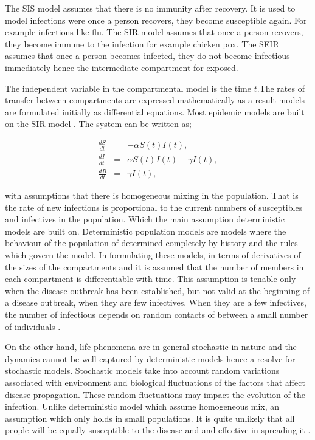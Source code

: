 The SIS model assumes that there is no immunity after recovery. It is used to model infections were once a person recovers, they become susceptible again. For example infections like flu. The SIR model assumes that once a person recovers, they become immune to the infection for example chicken pox. The SEIR assumes that once a person becomes infected, they do not become infectious immediately hence the intermediate compartment for exposed. 


The independent variable in the compartmental model is the time $t$.The rates of transfer between compartments are expressed mathematically as a result models are formulated initially as differential equations. Most epidemic models are built on the SIR model \citep{m1925applications}. The system can be written as;

\begin{center}
\begin{equation} \label{eqn1_1}
\begin{array}{ccl}
\frac{dS}{dt} &= &-\alpha S(t) I(t),\\
 \frac{dI}{dt} &=& \alpha S(t) I(t) - \gamma  I(t), \\
 \frac{dR}{dt} &= &\gamma  I(t),
\end{array}  
\end{equation}
\end{center}



with assumptions that there is homogeneous mixing in the population. That is the rate of new infections is proportional to the current numbers of susceptibles and infectives in the population. Which the main assumption deterministic models are built on. Deterministic population  models are models where the behaviour of the population of determined completely by history and the rules which govern the model. In formulating these models, in terms of derivatives of the sizes of the compartments and it is assumed that the number of members in each compartment is differentiable with time. This assumption is tenable only when the disease outbreak has been established, but not valid at the beginning of a disease outbreak, when they are few infectives. When they are a few infectives, the number of infectious depends on random contacts of between a small number of individuals \citep{brauer2012mathematical}.
 
On the other hand, life phenomena are in general stochastic in nature and the dynamics cannot be well captured by deterministic models hence a resolve for stochastic models. Stochastic models take into account random variations associated with environment and biological fluctuations of the factors that affect disease propagation. These random fluctuations may impact the evolution of the infection. Unlike deterministic model which assume homogeneous mix, an assumption which only holds in small populations. It is quite unlikely that all people will be equally susceptible to the disease and and effective in spreading it \citep{ball1985deterministic}.

